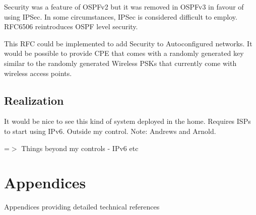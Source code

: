 \documentclass[12pt]{report}
\begin{document}
Security was a feature of OSPFv2 but it was removed in OSPFv3 in favour of using 
IPSec. In some circumstances, IPSec is considered difficult to employ. RFC6506 
reintroduces OSPF level security. 

This RFC could be implemented to add Security to Autoconfigured networks. It would 
be possible to provide CPE that comes with a randomly generated key similar to the 
randomly generated Wireless PSKs that currently come with wireless access points.

\section{Realization}
It would be nice to see this kind of system deployed in the home. 
Requires ISPs to start using IPv6.
Outside my control. 
Note: Andrews and Arnold.
 
=$>$ Things beyond my controls - IPv6 etc

\pagebreak

\printnomenclature

\pagebreak

{}


\appendix 

\chapter{Appendices}
Appendices providing detailed technical references
\end{document}

